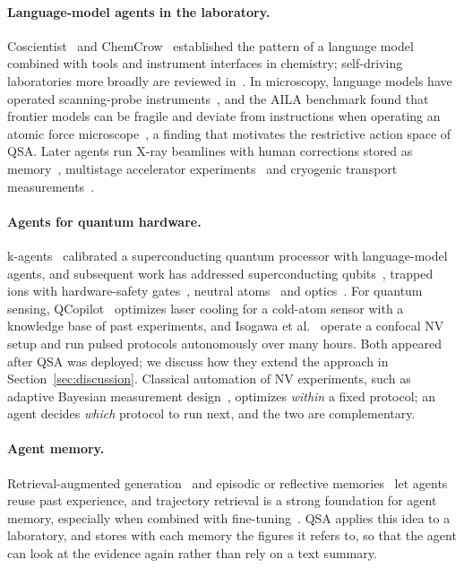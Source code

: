 \documentclass[10pt]{article}
\newcommand{\qsa}{QSA}
\begin{document}
\paragraph{Language-model agents in the laboratory.}
Coscientist~\cite{boiko2023coscientist} and ChemCrow~\cite{bran2023chemcrow} established the pattern of a language model combined with tools and instrument interfaces in chemistry; self-driving laboratories more broadly are reviewed in~\cite{tom2024sdl}.
In microscopy, language models have operated scanning-probe instruments~\cite{liu2024microscopy}, and the AILA benchmark found that frontier models can be fragile and deviate from instructions when operating an atomic force microscope~\cite{mandal2024aila}, a finding that motivates the restrictive action space of \qsa{}.
Later agents run X-ray beamlines with human corrections stored as memory~\cite{vriza2025learnonjob}, multistage accelerator experiments~\cite{hellert2025accelerator} and cryogenic transport measurements~\cite{bauer2026transport}.

\paragraph{Agents for quantum hardware.}
k-agents~\cite{cao2024kagents} calibrated a superconducting quantum processor with language-model agents, and subsequent work has addressed superconducting qubits~\cite{li2026scqubit,xu2026vibe,fan2026qmclaw}, trapped ions with hardware-safety gates~\cite{wang2026artiq}, neutral atoms~\cite{dalyac2026neutralatom} and optics~\cite{uddin2025optics,lopez2026opticsvlm}.
For quantum sensing, QCopilot~\cite{sha2025qcopilot} optimizes laser cooling for a cold-atom sensor with a knowledge base of past experiments, and Isogawa et al.~\cite{isogawa2026nv} operate a confocal NV setup and run pulsed protocols autonomously over many hours.
Both appeared after \qsa{} was deployed; we discuss how they extend the approach in Section~\ref{sec:discussion}.
Classical automation of NV experiments, such as adaptive Bayesian measurement design~\cite{bonato2015adaptive,santagati2018magnetic,dushenko2020odmr,mcmichael2021ramsey}, optimizes \emph{within} a fixed protocol; an agent decides \emph{which} protocol to run next, and the two are complementary.

\paragraph{Agent memory.}
Retrieval-augmented generation~\cite{lewis2020rag} and episodic or reflective memories~\cite{shinn2023reflexion,park2023generative,wang2023voyager,zhao2023expel} let agents reuse past experience, and trajectory retrieval is a strong foundation for agent memory, especially when combined with fine-tuning~\cite{ferraz2026exprag}.
\qsa{} applies this idea to a laboratory, and stores with each memory the figures it refers to, so that the agent can look at the evidence again rather than rely on a text summary.
\end{document}
